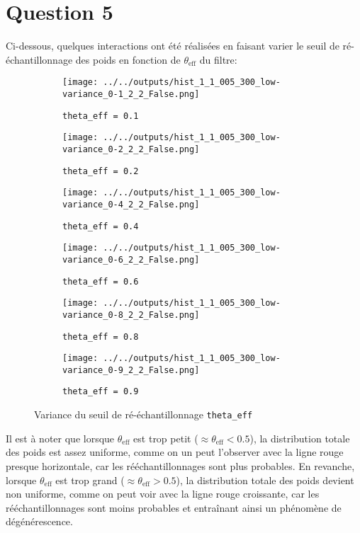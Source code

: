 \documentclass[../CSC_5RO12_TA_TP3.tex]{subfiles}
\begin{document}
\section{Question 5}
\noindent Ci-dessous, quelques interactions ont été réalisées en faisant varier le seuil de ré-échantillonnage des poids en fonction de $\theta_{\text{eff}}$ du filtre:
\begin{figure}[H]
    \centering
    \begin{subfigure}[b]{0.475\textwidth}
        \centering
        \texttt{[image: ../../outputs/hist\_1\_1\_005\_300\_low-variance\_0-1\_2\_2\_False.png]}
        \caption{\texttt{theta\_eff = 0.1}}
        \label{}
    \end{subfigure}\hfill
    \begin{subfigure}[b]{0.475\textwidth}
        \centering
        \texttt{[image: ../../outputs/hist\_1\_1\_005\_300\_low-variance\_0-2\_2\_2\_False.png]}
        \caption{\texttt{theta\_eff = 0.2}}
        \label{}
    \end{subfigure}
    \begin{subfigure}[b]{0.475\textwidth}
        \centering
        \texttt{[image: ../../outputs/hist\_1\_1\_005\_300\_low-variance\_0-4\_2\_2\_False.png]}
        \caption{\texttt{theta\_eff = 0.4}}
        \label{}
    \end{subfigure}\hfill
    \begin{subfigure}[b]{0.475\textwidth}
        \centering
        \texttt{[image: ../../outputs/hist\_1\_1\_005\_300\_low-variance\_0-6\_2\_2\_False.png]}
        \caption{\texttt{theta\_eff = 0.6}}
        \label{}
    \end{subfigure}
    \begin{subfigure}[b]{0.475\textwidth}
        \centering
        \texttt{[image: ../../outputs/hist\_1\_1\_005\_300\_low-variance\_0-8\_2\_2\_False.png]}
        \caption{\texttt{theta\_eff = 0.8}}
        \label{}
    \end{subfigure}\hfill
    \begin{subfigure}[b]{0.475\textwidth}
        \centering
        \texttt{[image: ../../outputs/hist\_1\_1\_005\_300\_low-variance\_0-9\_2\_2\_False.png]}
        \caption{\texttt{theta\_eff = 0.9}}
        \label{}
    \end{subfigure}
    \caption{Variance du seuil de ré-échantillonnage \texttt{theta\_eff}}
    \label{}
\end{figure}
\noindent Il est à noter que lorsque $\theta_{\text{eff}}$ est trop petit ($\approx \theta_{\text{eff}} < 0.5$), la distribution totale des poids est assez uniforme, comme on un peut l'observer avec la ligne rouge presque horizontale, car les rééchantillonnages sont plus probables. En revanche, lorsque $\theta_{\text{eff}}$ est trop grand ($\approx \theta_{\text{eff}} > 0.5$), la distribution totale des poids devient non uniforme, comme on peut voir avec la ligne rouge croissante, car les rééchantillonnages sont moins probables et entraînant ainsi un phénomène de dégénérescence.
\end{document}
